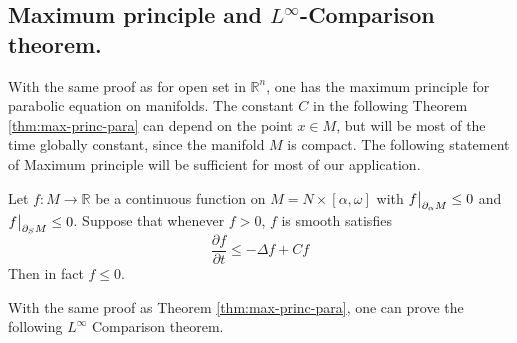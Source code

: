 \subsection{Maximum principle and \(L^\infty\)-Comparison theorem.}
\label{sec:org641166d}

With the same proof as for open set in \(\mathbb{R}^n\), one has the maximum principle
for parabolic equation on manifolds. The constant \(C\) in the following Theorem
\ref{thm:max-princ-para} can depend on the point \(x\in M\), but will be most of the time
globally constant, since the manifold \(M\) is compact. The following statement of
Maximum principle will be sufficient for most of our application.

\begin{theorem}
\label{thm:max-princ-para}
Let \(f: M \longrightarrow \mathbb{R}\) be a continuous function on \(M = N\times
[\alpha,\omega]\) with \(\restr{f}{\partial_\alpha M} \leq 0\) and \(\restr{f}{
\partial_S M} \leq 0\). Suppose that whenever \(f>0\), \(f\) is smooth satisfies
\[
 \frac{\partial f}{\partial t} \leq -\Delta f + Cf
\]
Then in fact \(f \leq 0\).
\end{theorem}

With the same proof as Theorem \ref{thm:max-princ-para}, one can prove the following \(L^\infty\) Comparison theorem.

